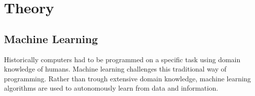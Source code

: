 \chapter{Theory}
\section{Machine Learning}

Historically computers had to be programmed on a specific task using domain knowledge of humans. Machine learning challenges this traditional way of programming. Rather than trough extensive domain knowledge, machine learning algorithms are used to autonomously learn from data and information. 
\\

